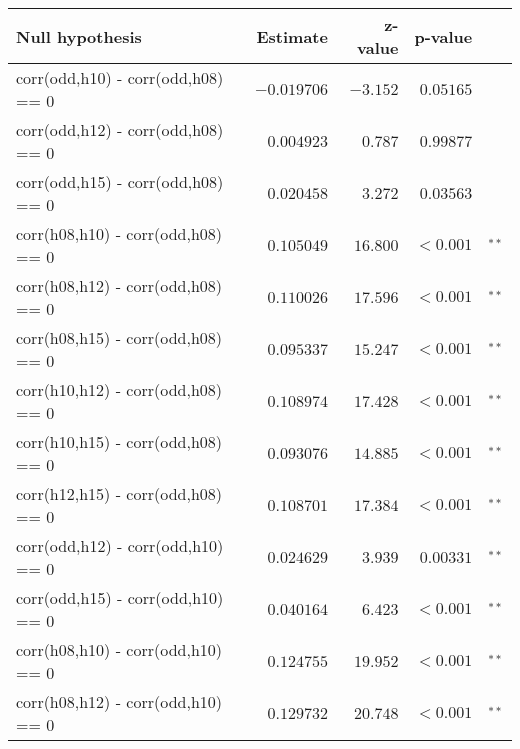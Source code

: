 \begin{table*}[t]\scriptsize
\caption{
Results from the post hoc pairwise comparisons of the linear mixed model built on the correlation data shown in \autoref{fig:corrERP}.
The first column represents the tested hypothesis; ``odd'' represents the oddball condition while ``h08'', ``h10'', ``h12'' and ``h15'' represent the hybrid condition at \SIlist[list-units = single]{8.57;10;12;15}{\Hz}, respectively.
Therefore ``corr(odd,h10)'' represents the correlation between oddball and \SI{10}{\Hz}-hybrid ERPs.
The first line of the table tests for significance in the difference between, on the one hand, correlation values between ERPs recorded in the oddball and in the \SI{10}{\Hz}-hybrid conditions and, on the other hand, correlation values between ERPs recorded in the oddball and in the \SI{8.57}{\Hz}-hybrid conditions.
The second column shows the estimate of the tested difference (reported in the first column), the third and fourth columns represent respectively the test statistic and the associated p-value.
the symbol $^{**}$ denotes statistical significance below 0.01.
}
\label{table:TukeyTable}
\centering
\begin{tabular}{l r r r l}
\toprule
Null hypothesis & Estimate & z-value & p-value & \tabularnewline
\toprule
corr(odd,h10) - corr(odd,h08)  == 0 & $ -0.019706 $ & $ -3.152 $ & $ 0.05165 $ & \tabularnewline
corr(odd,h12) - corr(odd,h08)  == 0 & $  0.004923 $ & $  0.787 $ & $ 0.99877 $ & \tabularnewline
corr(odd,h15) - corr(odd,h08)  == 0 & $  0.020458 $ & $  3.272 $ & $ 0.03563 $ & \tabularnewline
corr(h08,h10) - corr(odd,h08)  == 0 & $  0.105049 $ & $ 16.800 $ & $< 0.001 $ & $^{**}$\tabularnewline
corr(h08,h12) - corr(odd,h08)  == 0 & $  0.110026 $ & $ 17.596 $ & $< 0.001 $ & $^{**}$\tabularnewline
corr(h08,h15) - corr(odd,h08)  == 0 & $  0.095337 $ & $ 15.247 $ & $< 0.001 $ & $^{**}$\tabularnewline
corr(h10,h12) - corr(odd,h08)  == 0 & $  0.108974 $ & $ 17.428 $ & $< 0.001 $ & $^{**}$\tabularnewline
corr(h10,h15) - corr(odd,h08)  == 0 & $  0.093076 $ & $ 14.885 $ & $< 0.001 $ & $^{**}$\tabularnewline
corr(h12,h15) - corr(odd,h08)  == 0 & $  0.108701 $ & $ 17.384 $ & $< 0.001 $ & $^{**}$\tabularnewline
corr(odd,h12) - corr(odd,h10)  == 0 & $  0.024629 $ & $  3.939 $ & $ 0.00331 $ & $^{**}$\tabularnewline
corr(odd,h15) - corr(odd,h10)  == 0 & $  0.040164 $ & $  6.423 $ & $< 0.001 $ & $^{**}$\tabularnewline
corr(h08,h10) - corr(odd,h10)  == 0 & $  0.124755 $ & $ 19.952 $ & $< 0.001 $ & $^{**}$\tabularnewline
corr(h08,h12) - corr(odd,h10)  == 0 & $  0.129732 $ & $ 20.748 $ & $< 0.001 $ & $^{**}$\tabularnewline

\end{tabular}
\end{table*}
